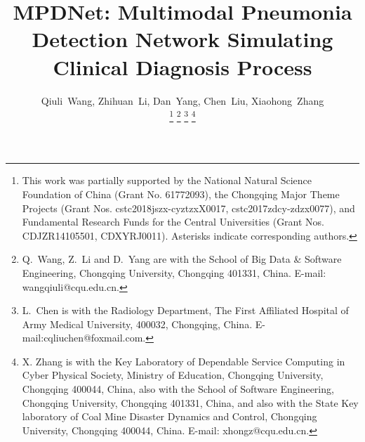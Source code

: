 \documentclass[journal]{IEEEtran}
\begin{document}
%
\title{MPDNet: Multimodal Pneumonia Detection Network Simulating Clinical Diagnosis Process}
%
%
%

\author{Qiuli~Wang,
        Zhihuan~Li,
        Dan~Yang,
        Chen~Liu,
        Xiaohong~Zhang%

\thanks{This work was partially supported by the National Natural Science Foundation of China (Grant No. 61772093), the Chongqing Major Theme Projects (Grant Nos. cstc2018jszx-cyztzxX0017, cstc2017zdcy-zdzx0077), and Fundamental Research Funds for the Central Universities (Grant Nos. CDJZR14105501, CDXYRJ0011). Asterisks indicate corresponding authors.
}
\thanks{Q.~Wang, Z.~Li and D.~Yang are with the School of Big Data \& Software Engineering, Chongqing University, Chongqing 401331, China. E-mail: wangqiuli@cqu.edu.cn.}
\thanks{L.~Chen is with the Radiology Department, The First Affiliated Hospital of Army Medical University, 400032, Chongqing, China. E-mail:cqliuchen@foxmail.com. }
\thanks{X. Zhang is with the Key Laboratory of Dependable Service Computing in Cyber Physical Society, Ministry of Education, Chongqing University, Chongqing 400044, China, also with the School of Software Engineering, Chongqing University, Chongqing 401331, China, and also with the State Key laboratory of Coal Mine Disaster Dynamics and Control, Chongqing University, Chongqing 400044, China. E-mail: xhongz@cqu.edu.cn.}

}
\end{document}
